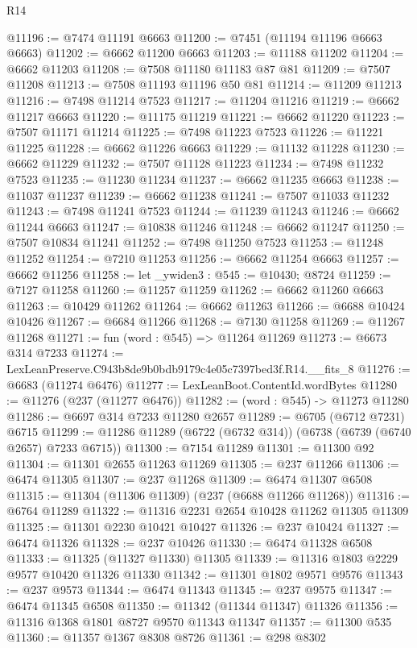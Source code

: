 \begin{lexlean}{R14}
\begin{coremodule}
@11196 := @7474 @11191 @6663
@11200 := @7451 (@11194 @11196 @6663 @6663)
@11202 := @6662 @11200 @6663
@11203 := @11188 @11202
@11204 := @6662 @11203
@11208 := @7508 @11180 @11183 @87 @81
@11209 := @7507 @11208
@11213 := @7508 @11193 @11196 @50 @81
@11214 := @11209 @11213
@11216 := @7498 @11214 @7523
@11217 := @11204 @11216
@11219 := @6662 @11217 @6663
@11220 := @11175 @11219
@11221 := @6662 @11220
@11223 := @7507 @11171 @11214
@11225 := @7498 @11223 @7523
@11226 := @11221 @11225
@11228 := @6662 @11226 @6663
@11229 := @11132 @11228
@11230 := @6662 @11229
@11232 := @7507 @11128 @11223
@11234 := @7498 @11232 @7523
@11235 := @11230 @11234
@11237 := @6662 @11235 @6663
@11238 := @11037 @11237
@11239 := @6662 @11238
@11241 := @7507 @11033 @11232
@11243 := @7498 @11241 @7523
@11244 := @11239 @11243
@11246 := @6662 @11244 @6663
@11247 := @10838 @11246
@11248 := @6662 @11247
@11250 := @7507 @10834 @11241
@11252 := @7498 @11250 @7523
@11253 := @11248 @11252
@11254 := @7210 @11253
@11256 := @6662 @11254 @6663
@11257 := @6662 @11256
@11258 := let _ywiden3 : @545 := @10430; @8724
@11259 := @7127 @11258
@11260 := @11257 @11259
@11262 := @6662 @11260 @6663
@11263 := @10429 @11262
@11264 := @6662 @11263
@11266 := @6688 @10424 @10426
@11267 := @6684 @11266
@11268 := @7130 @11258
@11269 := @11267 @11268
@11271 := fun (word : @545) => @11264 @11269
@11273 := @6673 @314 @7233
@11274 := LexLeanPreserve.C943b8de9b0bdb9179c4e05c7397bed3f.R14.__fits_8
@11276 := @6683 (@11274 @6476)
@11277 := LexLeanBoot.ContentId.wordBytes
@11280 := @11276 (@237 (@11277 @6476))
@11282 := (word : @545) -> @11273 @11280
@11286 := @6697 @314 @7233 @11280 @2657
@11289 := @6705 (@6712 @7231) @6715
@11299 := @11286 @11289 (@6722 (@6732 @314)) (@6738 (@6739 (@6740 @2657) @7233 @6715))
@11300 := @7154 @11289
@11301 := @11300 @92
@11304 := @11301 @2655 @11263 @11269
@11305 := @237 @11266
@11306 := @6474 @11305
@11307 := @237 @11268
@11309 := @6474 @11307 @6508
@11315 := @11304 (@11306 @11309) (@237 (@6688 @11266 @11268))
@11316 := @6764 @11289
@11322 := @11316 @2231 @2654 @10428 @11262 @11305 @11309
@11325 := @11301 @2230 @10421 @10427
@11326 := @237 @10424
@11327 := @6474 @11326
@11328 := @237 @10426
@11330 := @6474 @11328 @6508
@11333 := @11325 (@11327 @11330) @11305
@11339 := @11316 @1803 @2229 @9577 @10420 @11326 @11330
@11342 := @11301 @1802 @9571 @9576
@11343 := @237 @9573
@11344 := @6474 @11343
@11345 := @237 @9575
@11347 := @6474 @11345 @6508
@11350 := @11342 (@11344 @11347) @11326
@11356 := @11316 @1368 @1801 @8727 @9570 @11343 @11347
@11357 := @11300 @535
@11360 := @11357 @1367 @8308 @8726
@11361 := @298 @8302

\end{coremodule}
\end{lexlean}
